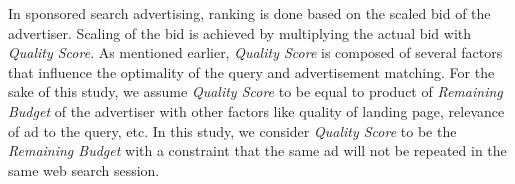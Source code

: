 \begin{table}
\centering
\caption{Table Showing Allotment Details \label{table:queriesExampleAllotment}}
\end{table}



In sponsored search advertising, ranking is done based on the scaled bid of the advertiser.  Scaling of the bid is achieved by multiplying the actual bid with {\it Quality Score}. As mentioned earlier, {\it Quality Score} is composed of several factors that influence the optimality of the query and advertisement matching. For the sake of this study, we assume {\it Quality Score} to be equal to product of {\it Remaining Budget} of the advertiser with other factors like quality of landing page, relevance of ad to the query, etc. In this study, we consider {\it Quality Score} to be the {\it Remaining Budget} with a constraint that the same ad will not be repeated in the same web search session.




